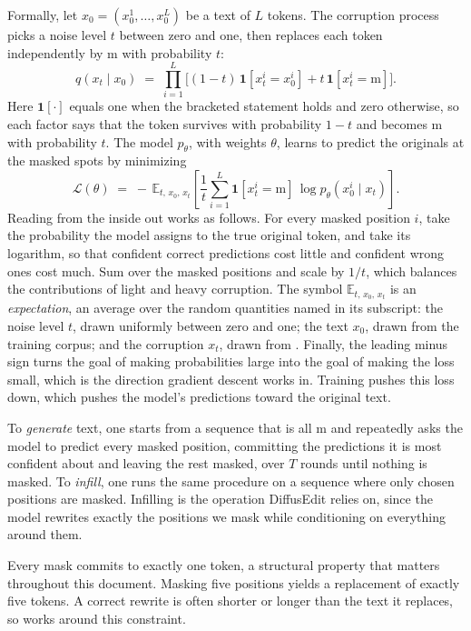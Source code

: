 \documentclass[]{paper}
\newcommand{\mask}{\ensuremath{\mathrm{m}}}
\newcommand{\E}{\mathbb{E}}
\newcommand{\ind}[1]{\mathbf{1}\!\left[#1\right]}
\begin{document}
Formally, let $x_0 = (x_0^1, \dots, x_0^L)$ be a text of $L$ tokens. The corruption process picks a noise level $t$ between zero and one, then replaces each token independently by \mask{} with probability $t$:
\begin{equation}
q\!\left(x_t \mid x_0\right) \;=\; \prod_{i=1}^{L}
\Big[ (1 - t)\, \ind{x_t^i = x_0^i} + t\, \ind{x_t^i = \mask} \Big].
\label{eq:forward}
\end{equation}
Here $\ind{\cdot}$ equals one when the bracketed statement holds and zero otherwise, so each factor says that the token survives with probability $1 - t$ and becomes \mask{} with probability $t$. The model $p_\theta$, with weights $\theta$, learns to predict the originals at the masked spots by minimizing
\begin{equation}
\mathcal{L}(\theta) \;=\;
-\,\E_{t,\, x_0,\, x_t}\!\left[
\frac{1}{t} \sum_{i=1}^{L} \ind{x_t^i = \mask}\, \log p_\theta\!\left(x_0^i \mid x_t\right)
\right].
\label{eq:loss}
\end{equation}
Reading  from the inside out works as follows. For every masked position $i$, take the probability the model assigns to the true original token, and take its logarithm, so that confident correct predictions cost little and confident wrong ones cost much. Sum over the masked positions and scale by $1/t$, which balances the contributions of light and heavy corruption. The symbol $\E_{t,\, x_0,\, x_t}$ is an \emph{expectation}, an average over the random quantities named in its subscript: the noise level $t$, drawn uniformly between zero and one; the text $x_0$, drawn from the training corpus; and the corruption $x_t$, drawn from . Finally, the leading minus sign turns the goal of making probabilities large into the goal of making the loss small, which is the direction gradient descent works in. Training pushes this loss down, which pushes the model's predictions toward the original text.

To \emph{generate} text, one starts from a sequence that is all \mask{} and repeatedly asks the model to predict every masked position, committing the predictions it is most confident about and leaving the rest masked, over $T$ rounds until nothing is masked. To \emph{infill}, one runs the same procedure on a sequence where only chosen positions are masked. Infilling is the operation DiffusEdit relies on, since the model rewrites exactly the positions we mask while conditioning on everything around them.

Every mask commits to exactly one token, a structural property that matters throughout this document. Masking five positions yields a replacement of exactly five tokens. A correct rewrite is often shorter or longer than the text it replaces, so  works around this constraint.
\end{document}
